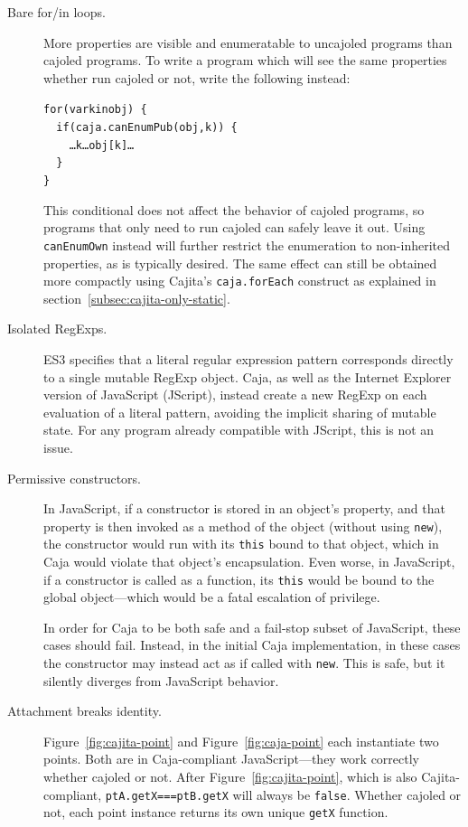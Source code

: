 \documentclass[letterpaper,twocolumn,10pt]{article}
\newcommand{\code}[1]{{\tt {#1}}}              %
\begin{document}
\begin{description}

  \item[Bare for/in loops.] More properties are visible and enumeratable to 
  uncajoled programs than cajoled programs. To write a program which 
  will see the same properties whether run cajoled or not, write the 
  following instead:
%
\begin{alltt}
for (var k in obj)\ \{ 
\ \ if (caja.canEnumPub(obj,k))\ \{
\ \ \ \ {\ldots}k{\ldots}obj[k]\ldots
\ \ \}
\}
\end{alltt}
%
  This conditional does not affect the behavior of cajoled programs, so
  programs that only need to run cajoled can safely leave it out. Using
  \code{canEnumOwn} instead will further restrict the enumeration to
  non-inherited properties, as is typically desired. The same effect can still
  be obtained more compactly using Cajita's \code{caja.forEach} construct as
  explained in section~\ref{subsec:cajita-only-static}.

  \item[Isolated RegExps.] ES3 specifies that a literal regular expression 
  pattern corresponds directly to a single mutable RegExp object. Caja, as 
  well as the Internet Explorer version of JavaScript (JScript), instead 
  create a new RegExp on each evaluation of a literal pattern, avoiding the 
  implicit sharing of mutable state. For any program already compatible with 
  JScript, this is not an issue.
  
  \item[Permissive constructors.] In JavaScript, if a constructor is stored in an 
  object's property, and that property is then invoked as a method of 
  the object (without using \code{new}), the constructor would run with its 
  \code{this} bound to that object, which in Caja would violate that object's 
  encapsulation. Even worse, in JavaScript, if a constructor is called 
  as a function, its \code{this} would be bound to the global 
  object---which would be a fatal escalation of privilege.
  
  In order for Caja to be both safe and a fail-stop subset of JavaScript, 
  these cases should fail. Instead, in the initial Caja implementation, in 
  these cases the constructor may instead act as if called with \code{new}. 
  This is safe, but it silently diverges from JavaScript behavior.
  
  \item[Attachment breaks identity.] Figure~\ref{fig:cajita-point} and 
  Figure~\ref{fig:caja-point} each instantiate two points. Both are in 
  Caja-compliant JavaScript---they work correctly whether cajoled or not. 
  After Figure~\ref{fig:cajita-point}, which is also Cajita-compliant, 
  \code{ptA.getX===ptB.getX} will always be \code{false}. Whether cajoled or 
  not, each point instance returns its own unique \code{getX} function.
  

\end{description}
\end{document}
